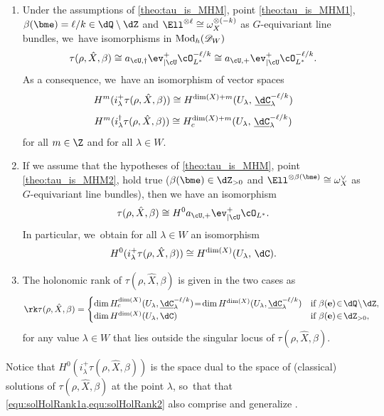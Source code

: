 \skpt
\begin{cor}\label{cor:holRankProb}
\begin{enumerate}
\item
Under the assumptions of \cref{theo:tau_is_MHM}, point \eqref{theo:tau_is_MHM1}, \ie $\beta(\bme) =\ell/k\in\dQ\setminus\dZ$ and $\Ell^{\otimes \ell} \cong \omega_X^{\otimes (-k)}$ as $G$-equivariant line bundles, we~have isomorphisms in $\textup{Mod}_h(\mathscr{D}_W)$
\[
\tau(\rho,\hat X, \beta) \cong a_{\cU,\dag} {\ev_{|\cU}^+}\cO_{L^*}^{-\ell/k} \cong a_{\cU,+} {\ev_{|\cU}^+}\cO_{L^*}^{-\ell/k}.
\]
As a consequence, we~have an isomorphism of vector spaces
\begin{equation}\label{equ:solHolRank1a}
H^m (i_\lambda^+ \tau(\rho, \hat X, \beta)) \cong H^{\dim(X) +m}(U_\lambda,\,\underline{\dC}^{-\ell/k}_\lambda)
\end{equation}
\resp
\begin{equation}\label{equ:solHolRank1b}
H^m (i_\lambda^\dag \tau(\rho, \hat X, \beta)) \cong H_c^{\dim(X) + m}(U_\lambda,\,\underline{\dC}^{-\ell/k}_\lambda)
\end{equation}
for all $m \in \Z$ and for all $\lambda\in W$.
\item
If we assume that the hypotheses of \cref{theo:tau_is_MHM}, point \eqref{theo:tau_is_MHM2}, hold true (\ie $\beta(\bme)\in \dZ_{>0}$ and $\Ell^{\otimes \beta(\bme)} \cong \omega_X^\vee$ as $G$-equivariant line bundles), then we have an isomorphism
\[
\tau(\rho,\hat X, \beta) \cong H^0 a_{\cU,+} {\ev_{|\cU}^+}\cO_{L^*}.
\]
In particular, we~obtain for all $\lambda\in W$ an isomorphism
\begin{equation}\label{equ:solHolRank2}
H^0 (i_\lambda^+ \tau(\rho, \hat X, \beta)) \cong H^{\dim(X)}(U_\lambda,\,\dC).
\end{equation}

\item The holonomic rank of $\tau(\rho,\hat X, \beta)$ is given in the two cases as
\[
\rk \tau(\rho, \hat X, \beta) =
\begin{cases}
\dim H_c^{\dim(X)}(U_\lambda, \underline{\dC}_\lambda^{-\ell/k})\!=\!
\dim H^{\dim(X)}(U_\lambda, \underline{\dC}_\lambda^{-\ell/k}) &
\textup{if } \beta(\mathbf{e})\!\in\!\dQ\!\setminus\!\dZ,\\
\dim H^{\dim(X)}(U_\lambda, \dC)  & \textup{if }\beta(\mathbf{e})\!\in\!\dZ_{>0},
\end{cases}
\]
for any value $\lambda\in W$ that lies outside the singular locus of $\tau(\rho,\hat X, \beta)$. \end{enumerate}
\end{cor}
Notice that $H^0 (i_\lambda^+ \tau(\rho, \hat X, \beta))$ is the space dual to the space of (classical) solutions of $\tau(\rho, \hat{X},\beta)$ at the point $\lambda$, so~that that \cref{equ:solHolRank1a,equ:solHolRank2} also comprise and generalize \cite[Cor.\,2.3]{HuangLianZhu}.

